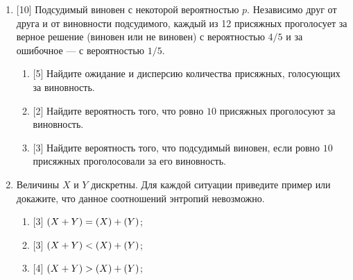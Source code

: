 \documentclass[12pt]{article}
\let\H\relax
\DeclareMathOperator{\H}{\mathbb{H}}
\begin{document}
\begin{enumerate}
    \item {[10]} Подсудимый виновен с некоторой вероятностью $p$.
    Независимо друг от друга и от виновности подсудимого, каждый из 12 присяжных проголосует за верное решение (виновен или не виновен) с вероятностью $4/5$
    и за ошибочное — с вероятностью $1/5$.
    \begin{enumerate}
        \item {[5]} Найдите ожидание и дисперсию количества присяжных, голосующих за виновность. 
        \item {[2]} Найдите вероятность того, что ровно $10$ присяжных проголосуют за виновность. 
        \item {[3]} Найдите вероятность того, что подсудимый виновен, если ровно $10$ присяжных проголосовали за его виновность. 
    \end{enumerate}

    \item Величины $X$ и $Y$ дискретны. 
    Для каждой ситуации приведите пример или докажите, что данное соотношений энтропий невозможно.
    \begin{enumerate}
        \item {[3]} $\H(X + Y) = \H(X) + \H(Y)$;
        \item {[3]} $\H(X + Y) < \H(X) + \H(Y)$;
        \item {[4]} $\H(X + Y) > \H(X) + \H(Y)$;
    \end{enumerate}



\end{enumerate}
\end{document}
